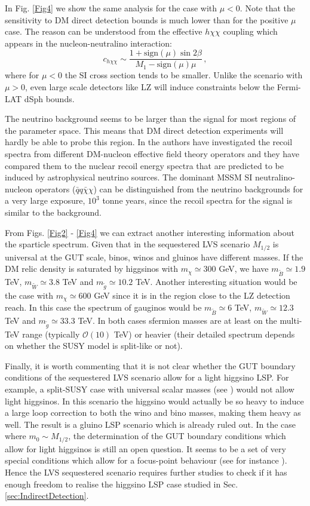 \documentclass[11pt,a4paper]{article}
\newcommand{\be}{\begin{equation}}
\newcommand{\ee}{\end{equation}}
\newcommand{\mc}{\mathcal}
\begin{document}
In Fig. \ref{Fig4} we show the same analysis for the case with $\mu<0$. Note that the sensitivity to DM direct detection bounds is much lower than for the positive $\mu$ case. The reason can be understood from the effective $h\chi\chi$ coupling which appears in the nucleon-neutralino interaction:
\be
c_{h\chi\chi}\sim \frac{1+\textrm{sign}(\mu)\sin2\beta}{M_1-\textrm{sign}(\mu)\mu}\,,
\ee
where for $\mu<0$ the SI cross section tends to be smaller. Unlike the scenario with $\mu>0$, even large scale detectors like LZ will induce constraints below the Fermi-LAT dSph bounds.

The neutrino background seems to be larger than the signal for most regions of the parameter space. This means that DM direct detection experiments will hardly be able to probe this region. In \cite{Dent:2016iht} the authors have investigated the recoil spectra from different DM-nucleon effective field theory operators and they have compared them to the nuclear recoil energy spectra that are predicted to be induced by astrophysical neutrino sources. The dominant MSSM SI neutralino-nucleon operators ($\bar{q}q\bar{\chi}\chi$) can be distinguished from the neutrino backgrounds for a very large exposure, $10^3$ tonne years, since the recoil spectra for the signal is similar to the background. 

From Figs. \ref{Fig2} - \ref{Fig4} we can extract another interesting information about the sparticle spectrum. Given that in the sequestered LVS scenario $M_{1/2}$ is universal at the GUT scale, binos, winos and gluinos have different masses. If the DM relic density is saturated by higgsinos with $m_\chi\simeq 300$ GeV, we have $m_{\tilde{B}}\simeq 1.9$ TeV, $m_{\tilde{W}}\simeq 3.8$ TeV and $m_{\tilde{g}}\simeq 10.2$ TeV. Another interesting situation would be the case with $m_\chi\simeq 600$ GeV since it is in the region close to the LZ detection reach. In this case the spectrum of gauginos would be $m_{\tilde{B}}\simeq 6$ TeV, $m_{\tilde{W}}\simeq 12.3$ TeV and $m_{\tilde{g}}\simeq 33.3$ TeV. In both cases sfermion masses are at least on the multi-TeV range (typically $\mc{O}(10)$ TeV) or heavier (their detailed spectrum depends on whether the SUSY model is split-like or not).

Finally, it is worth commenting that it is not clear whether the GUT boundary conditions of the sequestered LVS scenario allow for a light higgsino LSP. For example, a split-SUSY case with universal scalar masses (see \cite{Aparicio:2015psl}) would not allow light higgsinos. In this scenario the higgsino would actually be so heavy to induce a large loop correction to both the wino and bino masses, making them heavy as well. The result is a gluino LSP scenario which is already ruled out. In the case where $m_0\sim M_{1/2}$, the determination of the GUT boundary conditions which allow for light higgsinos is still an open question. It seems to be a set of very special conditions which allow for a focus-point behaviour (see for instance \cite{Aparicio:2015sda}). Hence the LVS sequestered scenario requires further studies to check if it has enough freedom to realise the higgsino LSP case studied in Sec. \ref{sec:IndirectDetection}.
\end{document}
